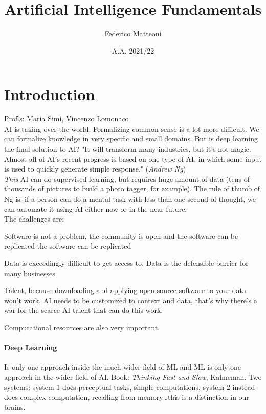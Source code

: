 \documentclass[10pt]{report}
\begin{document}
\title{Artificial Intelligence Fundamentals}
\author{Federico Matteoni}
\date{A.A. 2021/22}
\renewcommand*\contentsname{Index}
\maketitle
\begin{multicols}{2}
\tableofcontents
\end{multicols}
\pagebreak
\section{Introduction}
Prof.s: Maria Simi, Vincenzo Lomonaco\\
AI is taking over the world. Formalizing common sense is a lot more difficult. We can formalize knowledge in very specific and small domains. But is deep learning the final solution to AI? "It will transform many industries, but it's not magic. Almost all of AI's recent progress is based on one type of AI, in which some input is used to quickly generate simple response." (\textit{Andrew Ng})\\
\textit{This} AI can do supervised learning, but requires huge amount of data (tens of thousands of pictures to build a photo tagger, for example). The rule of thumb of Ng is: if a person can do a mental task with less than one second of thought, we can automate it using AI either now or in the near future.\\
The challenges are:
\begin{list}{}{}
	\item Software is not a problem, the community is open and the software can be replicated the software can be replicated
	\item Data is exceedingly difficult to get access to. Data is the defensible barrier for many businesses
	\item Talent, because downloading and applying open-source software to your data won't work. AI needs to be customized to context and data, that's why there's a war for the scarce AI talent that can do this work.
	\item Computational resources are also very important.
\end{list}
\paragraph{Deep Learning} Is only one approach inside the much wider field of ML and ML is only one approach in the wider field of AI. Book: \textit{Thinking Fast and Slow}, Kahneman. Two systems: system 1 does perceptual tasks, simple computations, system 2 instead does complex computation, recalling from memory\ldots this is a distinction in our brains.
\end{document}
